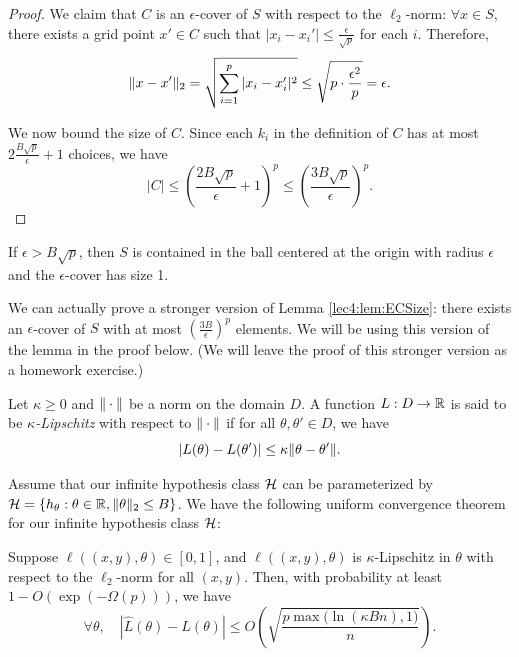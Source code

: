 \begin{proof}
We claim that $C$ is an $\epsilon$-cover of $S$ with respect to the $\ell_2$-norm: $\forall x \in S$, there exists a grid point $x' \in C$ such that $|x_i-x_i'| \le \tfrac{\epsilon}{\sqrt{p}}$ for each $i$. Therefore,
$$\|x-x'\|_2 = \sqrt{\sum_{i = 1}^p |x_i - x_i'|^2} \leq \sqrt{p\cdot \frac{\epsilon^2}{p}} = \epsilon.$$

We now bound the size of $C$. Since each $k_i$ in the definition of $C$ has at most $2\tfrac{B\sqrt{p}}{\epsilon}+1$ choices, we have 
\begin{equation}
|C| \le \left( \frac{2B\sqrt{p}}{\epsilon} +1\right)^p \le \left(\frac{3B\sqrt{p}}{\epsilon}\right)^p.
\end{equation}
\end{proof}

\begin{remark}
If $\epsilon > B\sqrt{p}$, then $S$ is contained in the ball centered at the origin with radius $\epsilon$ and the $\epsilon$-cover has size 1.
\end{remark}

\begin{remark}\label{lec4:rem:enet}
We can actually prove a stronger version of Lemma \ref{lec4:lem:ECSize}: there exists an $\epsilon$-cover of $S$ with at most $\left(\frac{3B}{\epsilon}\right)^p$ elements. We will be using this version of the lemma in the proof below. (We will leave the proof of this stronger version as a homework exercise.)
\end{remark}


\begin{definition}
Let $\kappa \ge 0$ and $\|\cdot\|$ be a norm on the domain $D$. A function $L:D \to \mathbb R$ is said to be \emph{$\kappa$-Lipschitz} with respect to $\|\cdot\|$ if for all $\theta, \theta' \in D$, we have
$$
    |L(\theta)-L(\theta')| \le \kappa \|\theta-\theta'\|.
$$
\end{definition}

Assume that our infinite hypothesis class $\mathcal H$ can be parameterized by $\mathcal H = \{h_{\theta} : \theta \in \mathbb{R}, \Vert \theta \Vert_2 \leq B\}$. We have the following uniform convergence theorem for our infinite hypothesis class $\mathcal H$:

\begin{theorem}\label{lec4:thm:main}
Suppose $\ell((x,y), \theta) \in [0,1]$, and $\ell((x,y), \theta)$ is $\kappa$-Lipschitz in $\theta$ with respect to the $\ell_2$-norm for all $(x, y)$. Then, with probability  at least $1-O(\exp(-\Omega(p)))$, we have
\begin{equation}
    \forall \theta, \quad |\hat L(\theta)- L(\theta)| \leq  O\left(\sqrt{\frac{p \max(\ln{(\kappa Bn), 1)}}{n}}\right).
\end{equation}
\end{theorem}

